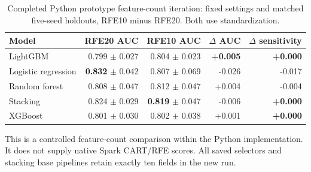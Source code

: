 \begin{table}[H]
\centering\small
\caption{Completed Python prototype feature-count iteration: fixed settings and matched five-seed holdouts, RFE10 minus RFE20. Both use standardization.}
\label{tab:rfe-feature-count}
\begin{tabular}{lrrrr}
\toprule
Model & RFE20 AUC & RFE10 AUC & $\Delta$ AUC & $\Delta$ sensitivity \\
\midrule
LightGBM & 0.799 $\pm$ 0.027 & 0.804 $\pm$ 0.023 & \textbf{+0.005} & \textbf{+0.000} \\
Logistic regression & \textbf{0.832} $\pm$ 0.042 & 0.807 $\pm$ 0.069 & -0.026 & -0.017 \\
Random forest & 0.808 $\pm$ 0.047 & 0.812 $\pm$ 0.047 & +0.004 & -0.004 \\
Stacking & 0.824 $\pm$ 0.029 & \textbf{0.819} $\pm$ 0.047 & -0.006 & \textbf{+0.000} \\
XGBoost & 0.801 $\pm$ 0.030 & 0.802 $\pm$ 0.038 & +0.001 & \textbf{+0.000} \\
\bottomrule
\end{tabular}
\end{table}
This is a controlled feature-count comparison within the Python implementation. It does not supply native Spark CART/RFE scores. All saved selectors and stacking base pipelines retain exactly ten fields in the new run.
